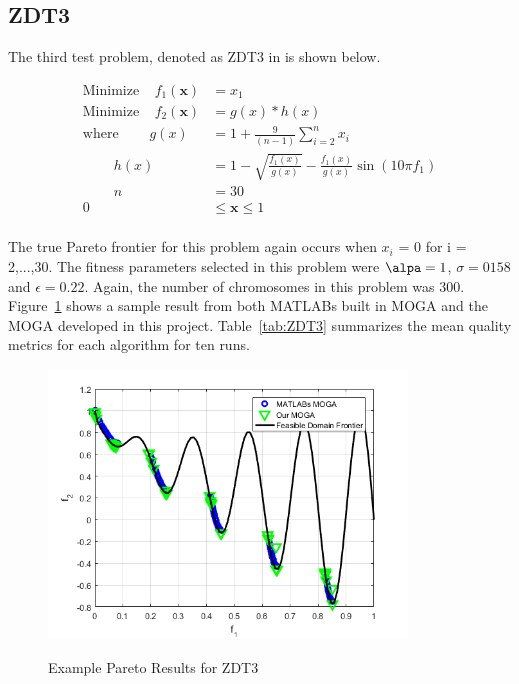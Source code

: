 \documentclass{article}
\begin{document}
\goodbreak

\newpage
\goodbreak
\subsection{ZDT3} 
The third test problem, denoted as ZDT3 in \cite{deb2001multi} is shown below. 


\begin{align*}
\textrm{Minimize} ~~~~~ f_1(\textbf{x}) &= x_1 \\
\textrm{Minimize} ~~~~~ f_2(\textbf{x}) &= g(x)*h(x) \\
\textrm{where} ~~~~~~~~~~ g(x) &= 1+\frac{9}{(n-1)}\sum_{i=2}^{n}x_i \\
~~~~~~~~~~ h(x) &= 1- \sqrt{\frac{f_1(x)}{g(x)}}- \frac{f_1(x)}{g(x)}\sin(10\pi f_1) \\
~~~~~~~~~~ n &= 30 \\
0 &\leq  \textbf{x}  \leq 1 \\
\end{align*}

\noindent The true Pareto frontier for this problem again occurs when $x_i$ = 0 for i = 2,...,30. The fitness parameters selected in this problem were $\alpa = 1$, $\sigma = 0158$ and $\epsilon = 0.22$. Again, the number of chromosomes in this problem was 300. Figure~\ref{fig:ZDT3} shows a sample result from both MATLABs built in MOGA and the MOGA developed in this project. Table~\ref{tab:ZDT3} summarizes the mean quality metrics for each algorithm for ten runs. \newline

\begin{figure}[H]
  \caption{Example Pareto Results for ZDT3}
  \centering
  \includegraphics[width=0.85\textwidth]{ZDT3_pareto_final.png}  
  \label{fig:ZDT3}
\end{figure}
\end{document}
